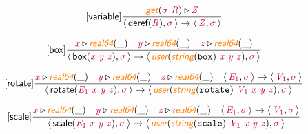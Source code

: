 \documentclass[10pt,leqno,fleqn]{article}
\newcommand{\artVariable}[1]{\mbox{\color{purple}\em #1\/}}
\newcommand{\artConstructor}[1]{\mbox{\sf #1}}
\newcommand{\artCaseInsensitiveLiteral}[1]{\mbox{\tt #1}}
\newcommand{\artSpecial}[1]{\mbox{\color{orange}\sf\em #1}}
\begin{document}
\begin{equation}
\tag*{[\artConstructor{\sf variable}]}
\begin{split}\frac{ \artSpecial{get}(\artVariable{$\sigma$}\ \artVariable{R})\triangleright \artVariable{Z} }{\langle\, \artConstructor{\sf deref}(\artVariable{R}), \artVariable{$\sigma$}\,\rangle \rightarrow \langle\, \artVariable{Z}, \artVariable{$\sigma$}\,\rangle }
\end{split}
\end{equation}

\begin{equation}
\tag*{[\artConstructor{\sf box}]}
\begin{split}\frac{ \artVariable{x}\triangleright \artSpecial{real64}(\_) \quad  \artVariable{y}\triangleright \artSpecial{real64}(\_) \quad  \artVariable{z}\triangleright \artSpecial{real64}(\_) }{\langle\, \artConstructor{\sf box}(\artVariable{x}\ \artVariable{y}\ \artVariable{z}), \artVariable{$\sigma$}\,\rangle \rightarrow \langle\, \artSpecial{user}(\artSpecial{string}(\artCaseInsensitiveLiteral{box})\ \artVariable{x}\ \artVariable{y}\ \artVariable{z}), \artVariable{$\sigma$}\,\rangle }
\end{split}
\end{equation}

\begin{equation}
\tag*{[\artConstructor{\sf rotate}]}
\begin{split}\frac{ \artVariable{x}\triangleright \artSpecial{real64}(\_) \quad  \artVariable{y}\triangleright \artSpecial{real64}(\_) \quad  \artVariable{z}\triangleright \artSpecial{real64}(\_) \quad \langle\, \artVariable{E$_{1}$}, \artVariable{$\sigma$}\,\rangle \rightarrow \langle\, \artVariable{V$_{1}$}, \artVariable{$\sigma$}\,\rangle }{\langle\, \artConstructor{\sf rotate}(\artVariable{E$_{1}$}\ \artVariable{x}\ \artVariable{y}\ \artVariable{z}), \artVariable{$\sigma$}\,\rangle \rightarrow \langle\, \artSpecial{user}(\artSpecial{string}(\artCaseInsensitiveLiteral{rotate})\ \artVariable{V$_{1}$}\ \artVariable{x}\ \artVariable{y}\ \artVariable{z}), \artVariable{$\sigma$}\,\rangle }
\end{split}
\end{equation}

\begin{equation}
\tag*{[\artConstructor{\sf scale}]}
\begin{split}\frac{ \artVariable{x}\triangleright \artSpecial{real64}(\_) \quad  \artVariable{y}\triangleright \artSpecial{real64}(\_) \quad  \artVariable{z}\triangleright \artSpecial{real64}(\_) \quad \langle\, \artVariable{E$_{1}$}, \artVariable{$\sigma$}\,\rangle \rightarrow \langle\, \artVariable{V$_{1}$}, \artVariable{$\sigma$}\,\rangle }{\langle\, \artConstructor{\sf scale}(\artVariable{E$_{1}$}\ \artVariable{x}\ \artVariable{y}\ \artVariable{z}), \artVariable{$\sigma$}\,\rangle \rightarrow \langle\, \artSpecial{user}(\artSpecial{string}(\artCaseInsensitiveLiteral{scale})\ \artVariable{V$_{1}$}\ \artVariable{x}\ \artVariable{y}\ \artVariable{z}), \artVariable{$\sigma$}\,\rangle }
\end{split}
\end{equation}
\end{document}
